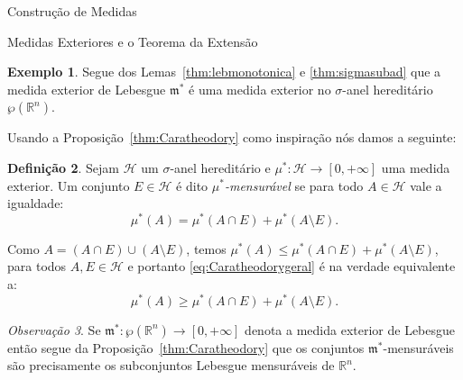 \documentclass[oneside,final,11pt]{amsbook}
\newcommand{\R}{\mathds R}
\newcommand{\leb}{\mathfrak m}
\theoremstyle{remark}\newtheorem{exercise}{Exercício}[chapter]
\theoremstyle{remark}\newtheorem{*exercise}[exercise]{\hbox to 0pt{\hskip 0pt minus 1fil*}Exercício}
\theoremstyle{definition}\newtheorem{exdefin}{Definição}[chapter]
\theoremstyle{plain}\newtheorem{teo}{Teorema}[section]
\theoremstyle{plain}\newtheorem{lem}[teo]{Lema}
\theoremstyle{plain}\newtheorem{prop}[teo]{Proposição}
\theoremstyle{plain}\newtheorem{cor}[teo]{Corolário}
\theoremstyle{definition}\newtheorem{defin}[teo]{Definição}
\theoremstyle{remark}\newtheorem{rem}[teo]{Observação}
\theoremstyle{definition}\newtheorem{notation}[teo]{Notação}
\theoremstyle{definition}\newtheorem{convention}[teo]{Convenção}
\theoremstyle{definition}\newtheorem{example}[teo]{Exemplo}
\numberwithin{section}{chapter}
\numberwithin{equation}{section}
\begin{document}
\begin{chapter}{Construção de Medidas}
\begin{section}{Medidas Exteriores e o Teorema da Extensão}
\begin{example}
Segue dos Lemas~\ref{thm:lebmonotonica} e \ref{thm:sigmasubad} que a medida exterior
de Lebesgue $\leb^*$ é uma medida exterior no $\sigma$-anel hereditário $\wp(\R^n)$.
\end{example}

Usando a Proposição~\ref{thm:Caratheodory} como inspiração nós damos a seguinte:
\begin{defin}
Sejam $\mathcal H$ um $\sigma$-anel hereditário e $\mu^*:\mathcal H\to[0,+\infty]$
uma medida exterior. Um conjunto $E\in\mathcal H$ é dito
{\em $\mu^*$-mensurável\/}%
%
%
se para todo $A\in\mathcal H$ vale a igualdade:
\begin{equation}\label{eq:Caratheodorygeral}
\mu^*(A)=\mu^*(A\cap E)+\mu^*(A\setminus E).
\end{equation}
\end{defin}
Como $A=(A\cap E)\cup(A\setminus E)$, temos $\mu^*(A)\le\mu^*(A\cap E)+\mu^*(A\setminus E)$,
para todos $A,E\in\mathcal H$ e portanto \eqref{eq:Caratheodorygeral} é na verdade equivalente a:
\[\mu^*(A)\ge\mu^*(A\cap E)+\mu^*(A\setminus E).\]

\begin{rem}\label{thm:lebstarmens}
Se $\leb^*:\wp(\R^n)\to[0,+\infty]$ denota a medida exterior de Lebesgue então segue
da Proposição~\ref{thm:Caratheodory} que os conjuntos $\leb^*$-mensuráveis são precisamente
os subconjuntos Lebesgue mensuráveis de $\R^n$.
\end{rem}


\end{section}
\end{chapter}
\end{document}

